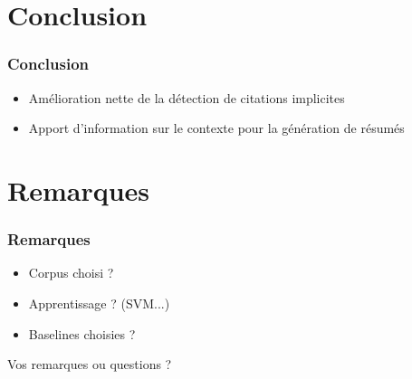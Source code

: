 \documentclass[12pt]{beamer}
\begin{document}
\section{Conclusion}
\begin{frame}
  \frametitle{Conclusion}

  \begin{itemize}
    \item Amélioration nette de la détection de citations implicites
    \item Apport d'information sur le contexte pour la génération de résumés
  \end{itemize}
\end{frame}

\section{Remarques}
\begin{frame}
  \frametitle{Remarques}

  \begin{itemize}
    \item Corpus choisi ?
    \item Apprentissage ? (SVM...)
    \item Baselines choisies ?
  \end{itemize}
  
  Vos remarques ou questions ?
\end{frame}
\end{document}
